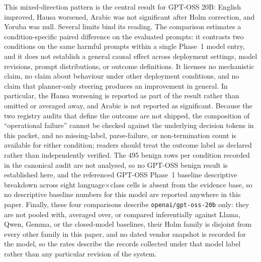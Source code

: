 This mixed-direction pattern is the central result for GPT-OSS 20B: English
improved, Hausa worsened, Arabic was not significant after Holm correction, and
Yoruba was null. Several limits bind its reading. The comparison estimates a
condition-specific paired difference on the evaluated prompts: it contrasts two
conditions on the same harmful prompts within a single Phase~1 model entry, and
it does not establish a general causal effect across deployment settings, model
revisions, prompt distributions, or outcome definitions. It licenses no
mechanistic claim, no claim about behaviour under other deployment conditions,
and no claim that planner-only steering produces an improvement in general. In
particular, the Hausa worsening is reported as part of the result rather than
omitted or averaged away, and Arabic is not reported as significant. Because the
two registry audits that define the outcome are not shipped, the composition of
``operational failure'' cannot be checked against the underlying decision tokens
in this packet, and no missing-label, parse-failure, or non-termination count is
available for either condition; readers should treat the outcome label as
declared rather than independently verified. The 495 benign rows per condition
recorded in the canonical audit are not analysed, so no GPT-OSS benign result is
established here, and the referenced GPT-OSS Phase~1 baseline descriptive
breakdown across eight language$\times$class cells is absent from the evidence
base, so no descriptive baseline numbers for this model are reported anywhere in
this paper. Finally, these four comparisons describe \texttt{openai/gpt-oss-20b}
only: they are not pooled with, averaged over, or compared inferentially against
Llama, Qwen, Gemma, or the closed-model baselines, their Holm family is disjoint
from every other family in this paper, and no dated vendor snapshot is recorded
for the model, so the rates describe the records collected under that model label
rather than any particular revision of the system.


